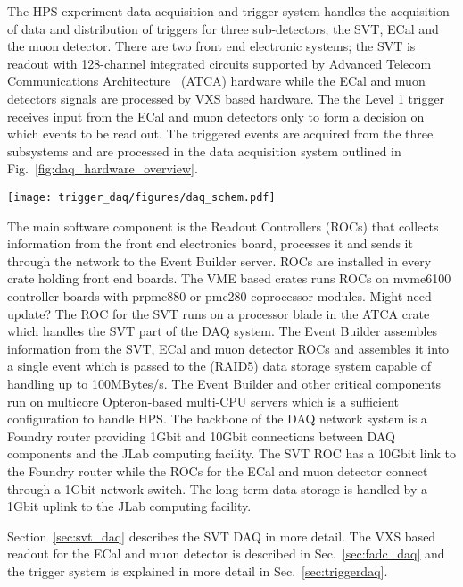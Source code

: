 The HPS experiment data acquisition and trigger system handles the acquisition of data and 
distribution of triggers for three sub-detectors; the SVT, ECal and the muon detector. There 
are two front end electronic systems; the SVT is readout with 128-channel integrated circuits
 supported by Advanced Telecom Communications Architecture~\cite{atca} (ATCA) hardware
 while the ECal and muon detectors signals are processed by VXS based hardware. The 
 the Level 1 trigger receives input from the ECal and muon detectors only to form a decision 
 on which events to be read out.  The triggered events are acquired from the three subsystems and are processed in the data acquisition system outlined in 
 Fig.~\ref{fig:daq_hardware_overview}.
\begin{figure*}[t]
\texttt{[image: trigger\_daq/figures/daq\_schem.pdf]}
\caption{\small{Schematic block diagram of the data acquisition system.}}
\label{fig:daq_hardware_overview}
\end{figure*}
The main software component is the Readout Controllers (ROCs) that collects information 
from the front end electronics board, processes it and sends it through the network to the 
Event Builder server. ROCs are installed in every crate holding front end boards. The 
VME based crates runs ROCs on mvme6100 controller boards with prpmc880 or pmc280 
coprocessor modules. {\color{red} Might need update?} The ROC for the SVT runs on 
a processor blade in the ATCA crate which handles the SVT part of the DAQ system. 
The Event Builder assembles 
information from the SVT, ECal and muon detector ROCs and assembles it into a single 
event which is passed to the (RAID5) data storage system capable of handling up to 
100MBytes/s. The Event Builder and other 
critical components run on multicore Opteron-based multi-CPU servers which is a 
sufficient configuration to handle HPS. The backbone of the DAQ network system is a 
Foundry router providing 1Gbit and 10Gbit connections between DAQ components and 
the JLab computing facility. The SVT ROC has a 10Gbit link to the Foundry router while the 
ROCs for the ECal and muon detector connect through a 1Gbit network switch. The long 
term data storage is handled by a 1Gbit uplink to the JLab computing facility. 

Section~\ref{sec:svt_daq} describes the SVT DAQ in more detail. The VXS based readout for 
the ECal and muon detector is described in Sec.~\ref{sec:fadc_daq} and the trigger 
system is explained in more detail in Sec.~\ref{sec:triggerdaq}.

